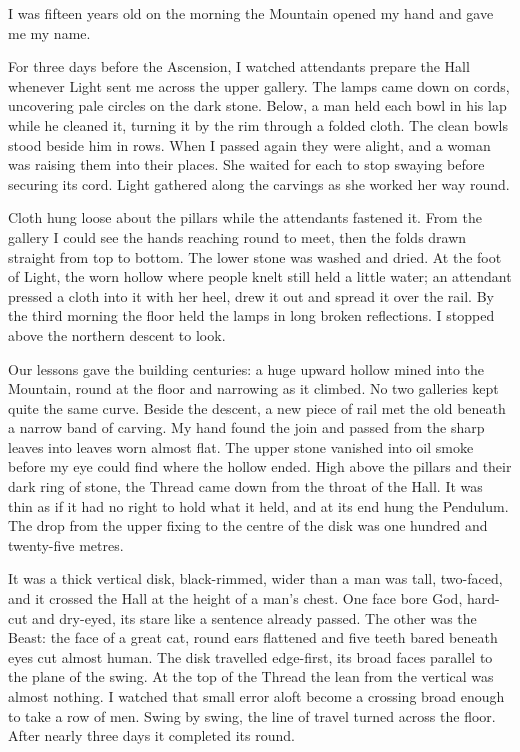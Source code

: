 I was fifteen years old on the morning the Mountain opened my hand and gave me my name.\par

\ornament

For three days before the Ascension, I watched attendants prepare the Hall whenever Light sent me across the upper gallery. The lamps came down on cords, uncovering pale circles on the dark stone. Below, a man held each bowl in his lap while he cleaned it, turning it by the rim through a folded cloth. The clean bowls stood beside him in rows. When I passed again they were alight, and a woman was raising them into their places. She waited for each to stop swaying before securing its cord. Light gathered along the carvings as she worked her way round.\par

Cloth hung loose about the pillars while the attendants fastened it. From the gallery I could see the hands reaching round to meet, then the folds drawn straight from top to bottom. The lower stone was washed and dried. At the foot of Light, the worn hollow where people knelt still held a little water; an attendant pressed a cloth into it with her heel, drew it out and spread it over the rail. By the third morning the floor held the lamps in long broken reflections. I stopped above the northern descent to look.\par

Our lessons gave the building centuries: a huge upward hollow mined into the Mountain, round at the floor and narrowing as it climbed. No two galleries kept quite the same curve. Beside the descent, a new piece of rail met the old beneath a narrow band of carving. My hand found the join and passed from the sharp leaves into leaves worn almost flat. The upper stone vanished into oil smoke before my eye could find where the hollow ended. High above the pillars and their dark ring of stone, the Thread came down from the throat of the Hall. It was thin as if it had no right to hold what it held, and at its end hung the Pendulum. The drop from the upper fixing to the centre of the disk was one hundred and twenty-five metres.\par

It was a thick vertical disk, black-rimmed, wider than a man was tall, two-faced, and it crossed the Hall at the height of a man's chest. One face bore God, hard-cut and dry-eyed, its stare like a sentence already passed. The other was the Beast: the face of a great cat, round ears flattened and five teeth bared beneath eyes cut almost human. The disk travelled edge-first, its broad faces parallel to the plane of the swing. At the top of the Thread the lean from the vertical was almost nothing. I watched that small error aloft become a crossing broad enough to take a row of men. Swing by swing, the line of travel turned across the floor. After nearly three days it completed its round.\par


